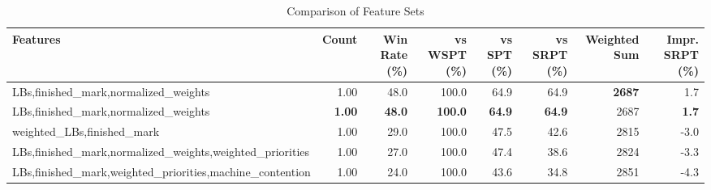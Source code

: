 \begin{table}[htbp]%
\centering%
\begin{tabular}{lrrrrrrr}%
\toprule%
\textbf{Features}&\textbf{Count}&\textbf{Win Rate (\%)}&\textbf{vs WSPT (\%)}&\textbf{vs SPT (\%)}&\textbf{vs SRPT (\%)}&\textbf{Weighted Sum}&\textbf{Impr. SRPT (\%)}\\%
\midrule%
LBs,finished_mark,normalized_weights&1.00&48.0&100.0&64.9&64.9&\textbf{2687}&1.7\\%
LBs,finished_mark,normalized_weights&\textbf{1.00}&\textbf{48.0}&\textbf{100.0}&\textbf{64.9}&\textbf{64.9}&2687&\textbf{1.7}\\%
weighted_LBs,finished_mark&1.00&29.0&100.0&47.5&42.6&2815&-3.0\\%
LBs,finished_mark,normalized_weights,weighted_priorities&1.00&27.0&100.0&47.4&38.6&2824&-3.3\\%
LBs,finished_mark,weighted_priorities,machine_contention&1.00&24.0&100.0&43.6&34.8&2851&-4.3\\%
\bottomrule%
\end{tabular}%
\caption{Comparison of Feature Sets}%
\label{tab:features}%
\end{table}